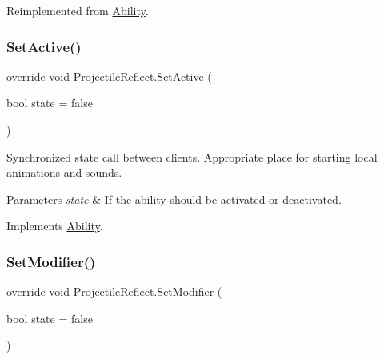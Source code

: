 Reimplemented from \hyperlink{class_ability_ae659b58f49f07191c1d269fc3ba59c7e}{Ability}.

\hypertarget{class_projectile_reflect_a8e25ce526f99de5980cb0bac20dc634c}{}\label{class_projectile_reflect_a8e25ce526f99de5980cb0bac20dc634c} 
\subsubsection{\texorpdfstring{Set\+Active()}{SetActive()}}
{\footnotesize\ttfamily override void Projectile\+Reflect.\+Set\+Active (\begin{DoxyParamCaption}\item[{bool}]{state = {\ttfamily false} }\end{DoxyParamCaption})\hspace{0.3cm}{\ttfamily [virtual]}}



Synchronized state call between clients. Appropriate place for starting local animations and sounds. 


\begin{DoxyParams}{Parameters}
{\em state} & If the ability should be activated or deactivated.\\
\hline
\end{DoxyParams}


Implements \hyperlink{class_ability_a10f7f3c2b63eeef6e352aee48d246384}{Ability}.

\hypertarget{class_projectile_reflect_a13bdedc65cb8eed7f5d8a6a733feebe8}{}\label{class_projectile_reflect_a13bdedc65cb8eed7f5d8a6a733feebe8} 
\subsubsection{\texorpdfstring{Set\+Modifier()}{SetModifier()}}
{\footnotesize\ttfamily override void Projectile\+Reflect.\+Set\+Modifier (\begin{DoxyParamCaption}\item[{bool}]{state = {\ttfamily false} }\end{DoxyParamCaption})\hspace{0.3cm}{\ttfamily [virtual]}}



